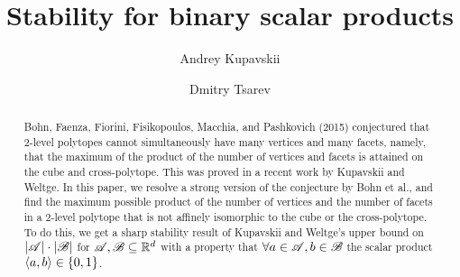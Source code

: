 

\title{\textbf{Stability for binary scalar products}}
\author[1,2]{Andrey Kupavskii}
\author[3]{Dmitry Tsarev}
\date{}



\maketitle

\begin{abstract}
    Bohn, Faenza, Fiorini, Fisikopoulos, Macchia, and Pashkovich (2015) conjectured that 2-level polytopes cannot simultaneously have many vertices and many facets, namely, that the maximum of the product of the number of vertices and facets is attained on the cube and cross-polytope. This was proved in a recent work by Kupavskii and Weltge. In this paper, we resolve a strong version of the conjecture by Bohn et al., and find the maximum possible product of the number of vertices and the number of facets in a 2-level polytope that is not affinely isomorphic to the cube or the cross-polytope. To do this, we get a sharp  stability result of Kupavskii and Weltge's upper bound on $\left|{\mathscr{A}}\right|\cdot\left|{\mathscr{B}}\right|$ for ${\mathscr{A}},{\mathscr{B}} \subseteq {\mathbb{R}}^d$ with a property that $\forall a \in {\mathscr{A}}, b \in {\mathscr{B}}$ the scalar product $\langle a, b\rangle \in\{0,1\}$.
\end{abstract}








\nocite{*}




